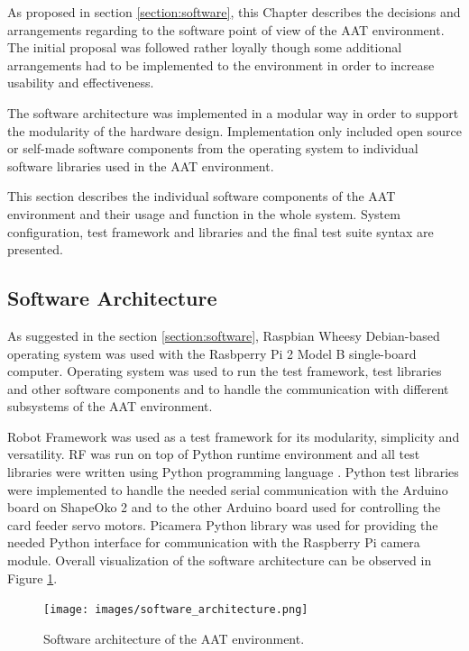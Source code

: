 As proposed in section \ref{section:software}, this Chapter describes the decisions and arrangements regarding to the software point of view of the AAT environment. The initial proposal was followed rather loyally though some additional arrangements had to be implemented to the environment in order to increase usability and effectiveness.

The software architecture was implemented in a modular way in order to support the modularity of the hardware design. Implementation only included open source or self-made software components from the operating system to individual software libraries used in the AAT environment.

This section describes the individual software components of the AAT environment and their usage and function in the whole system. System configuration, test framework and libraries and the final test suite syntax are presented.

\subsection{Software Architecture}
\label{subsection:Software architecture}

As suggested in the section \ref{section:software}, Raspbian Wheesy Debian-based operating system was used with the Rasbperry Pi 2 Model B single-board computer. Operating system was used to run the test framework, test libraries and other software components and to handle the communication with different subsystems of the AAT environment.

Robot Framework was used as a test framework for its modularity, simplicity and versatility. RF was run on top of Python runtime environment and all test libraries were written using Python programming language \citep{python}. Python test libraries were implemented to handle the needed serial communication with the Arduino board on ShapeOko 2 and to the other Arduino board used for controlling the card feeder servo motors. Picamera \citep{picamera} Python library was used for providing the needed Python interface for communication with the Raspberry Pi camera module. Overall visualization of the software architecture can be observed in Figure \ref{fig:software_architecture}.

\begin{figure}[ht]
  \begin{center}
    \texttt{[image: images/software\_architecture.png]}
    \caption{Software architecture of the AAT environment.}
    \label{fig:software_architecture}
  \end{center}
\end{figure}
\FloatBarrier

